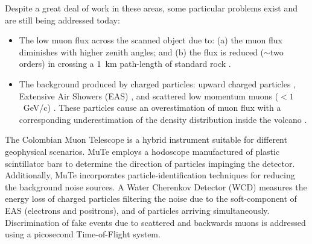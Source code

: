\documentclass[letterpaper,11pt]{article}
\begin{document}
Despite a great deal of work in these areas, some particular problems exist and are still being addressed today:
\begin{itemize}

\item The low muon flux across the scanned object due to: (a) the muon flux diminishes with higher zenith angles; and (b) the flux is reduced ($\sim$two orders) in crossing a $1$~km path-length of standard rock \cite{groom2001muon, groom2000passage}. 



\item The background produced by charged particles: upward charged particles \cite{jourde2013experimental}, Extensive Air Showers (EAS)  \cite{nishiyama2014experimental, Olah2017ICRC, KUSAGAYA2015, Bene2013, Olh2017}, and scattered low momentum muons ($< 1$~GeV/c) \cite{nishiyama2016monte, Gomez2017, Olh2018, Olah2018Invest, ambrosino2015joint}. These particles cause an overestimation of muon flux with a corresponding underestimation of the density distribution inside the volcano \cite{carbone2013experiment, nishiyama2016monte}.
\end{itemize}


The Colombian Muon Telescope \cite{AsoreyEtal2017B, SierraPortaEtal2018} is a hybrid instrument suitable for different geophysical scenarios. MuTe employs a hodoscope manufactured of plastic scintillator bars to determine the direction of particles impinging the detector. Additionally, MuTe incorporates particle-identification techniques for reducing the background noise sources\cite{Bonechi2020, PenaRodriguez2019}. A Water Cherenkov Detector (WCD) measures the energy loss of charged particles filtering the noise due to the soft-component of EAS (electrons and positrons), and of particles arriving simultaneously. Discrimination of fake events due to scattered and backwards muons is addressed using a picosecond Time-of-Flight system.
\end{document}
